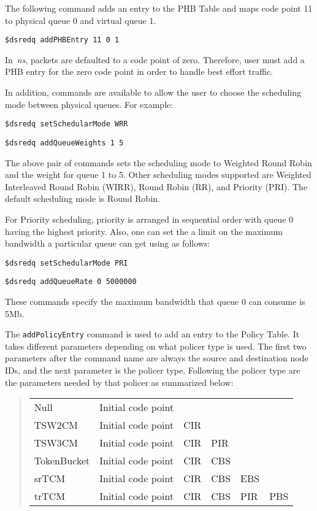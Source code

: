The following command adds an entry to the PHB Table and 
  maps code point 11 to physical queue 0 and virtual queue 1. 

{\tt \$dsredq addPHBEntry 11 0 1}

In~\emph{ns}, packets are defaulted to a code point of zero.
Therefore, user must add a PHB entry for the zero code point in order to 
 handle best effort traffic.

In addition, commands are available to allow the user to choose the 
  scheduling mode between physical queues. 
For example:

{\tt \$dsredq setSchedularMode WRR}

{\tt \$dsredq addQueueWeights 1 5}

The above pair of commands sets the scheduling mode to Weighted Round Robin 
  and the weight for queue 1 to 5. 
Other scheduling modes supported are 
  Weighted Interleaved Round Robin (WIRR), Round Robin (RR), 
  and Priority (PRI). 
The default scheduling mode is Round Robin.

For Priority scheduling, 
  priority is arranged in sequential order with 
  queue 0 having the highest priority. 
Also, one can set the a limit on the maximum bandwidth 
  a particular queue can get using as follows:

{\tt \$dsredq setSchedularMode PRI}

{\tt \$dsredq addQueueRate 0 5000000}

These commands specify the maximum bandwidth that 
  queue 0 can consume is 5Mb.

The {\tt addPolicyEntry} command is used to 
  add an entry to the Policy Table.  
It takes different parameters depending on what policer type is used.  
The first two parameters after the command name are always 
  the source and destination node IDs, 
  and the next parameter is the policer type. 
Following the policer type are the parameters needed by that policer as 
summarized below:

\begin{quote}
\begin{tabular}{llllll}
Null&{Initial code point}\\
TSW2CM&{Initial code point}&CIR\\
TSW3CM&{Initial code point}&CIR&PIR\\
TokenBucket&{Initial code point}&CIR&CBS\\
srTCM&{Initial code point}&CIR&CBS&EBS\\
trTCM&{Initial code point}&CIR&CBS&PIR&PBS
\end{tabular}
\end{quote}
 
